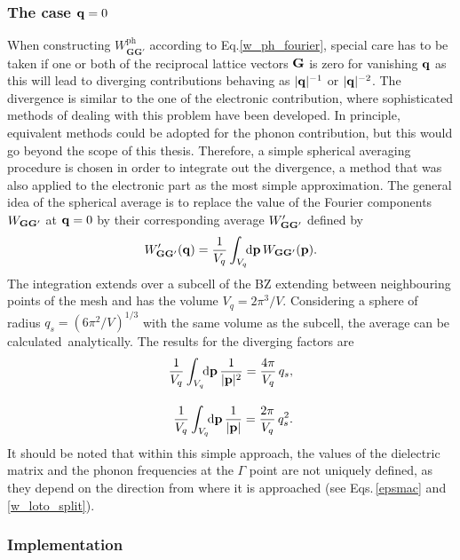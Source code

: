 \subsubsection{The case \texorpdfstring{$\mathbf{q}=0$}{q0} }
When constructing $W_\mathbf{GG'}^\text{ph}$ according to Eq.\;\eqref{w_ph_fourier}, special care has to be taken if one or both of the reciprocal lattice vectors $\mathbf{G}$ is zero for vanishing $\mathbf{q}$ as this will lead to diverging contributions behaving as $|\mathbf{q}|^{-1}$ or $|\mathbf{q}|^{-2}$. The divergence is similar to the one of the electronic contribution, where sophisticated methods of dealing with this problem have been developed\cite{Freysoldt_Eggert_Rinke_Schindlmayr_Godby_Scheffler_2007,rohlf_louie_1998}. In principle, equivalent methods could be adopted for the phonon contribution, but this would go beyond the scope of this thesis. Therefore, a simple spherical averaging procedure is chosen in order to integrate out the divergence, a method that was also applied to the electronic part as the most simple approximation\cite{pusching_phd}. The general idea of the spherical average is to replace the value of the Fourier components $ W_{\mathbf{G}\mathbf{G}'}$ at $\mathbf{q}=0$ by their corresponding average $ W'_{\mathbf{G}\mathbf{G}'}$  defined by 
%
\begin{align}\label{av_int}
     W'_{\mathbf{G}\mathbf{G}'}(\mathbf{q}) = \frac{1}{V_q}\int_{V_q}\text{\!\!d}\mathbf{p}\,W_{\mathbf{G}\mathbf{G}'}(\mathbf{p}).
\end{align}
%
The integration extends over a subcell of the BZ  extending between neighbouring points of the mesh and has the volume $ V_q = 2\pi^3/V$. Considering a sphere of radius $q_s = \left(6\pi^2/V\right)^{1/3}$ with the same volume as the subcell, the average can be calculated~analytically.  The results for the diverging factors are
 \begin{align}
     \frac{1}{V_q}\int_{V_q}\text{\!\!d}\mathbf{p}\,\frac{1}{|\mathbf{p}|^2} =  \frac{4\pi}{V_q}\,q_s,\\[10pt]
     \frac{1}{V_q}\int_{V_q}\text{\!\!d}\mathbf{p}\,\frac{1}{|\mathbf{p}|} = \frac{2\pi}{V_q}\,q^2_s.
 \end{align}
%
It should be noted that within this simple approach, the values of the dielectric matrix and the phonon frequencies at the $\Gamma$ point are not uniquely defined, as they depend on the direction from where it is approached (see Eqs.\,\eqref{epsmac} and \eqref{w_loto_split}).

\subsubsection{Implementation}\label{implement_subsec}

